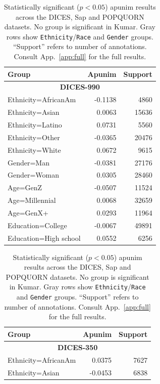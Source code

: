 \documentclass[manuscript,screen,review,anonymous]{acmart}
\theoremstyle{acmplain}
\theoremstyle{researchquestionstyle}
\begin{document}
\begin{table}[t]
	\caption{Statistically significant ($p<0.05$) apunim results across the DICES, Sap and POPQUORN datasets. No group is significant in Kumar. Gray rows show \texttt{Ethnicity}/\texttt{Race} and \texttt{Gender} groups. ``Support'' refers to number of annotations. Consult App.~\ref{app:full} for the full results.}
	\label{tab:apunim-main}
	\small
	\centering
	\setlength{\tabcolsep}{4pt}
	\begin{minipage}[t]{0.485\linewidth}
		\begin{tabularx}{\linewidth}{X r r}
			\toprule
			\textbf{Group} & \textbf{Apunim} & \textbf{Support} \\
			\midrule
			\multicolumn{3}{c}{\textbf{DICES-990}} \\
			\midrule
			\rowcolor{gray!15}
			Ethnicity=AfricanAm & -0.1138 & 4860 \\
			\rowcolor{gray!15}
			Ethnicity=Asian & 0.0063 & 15636 \\
			\rowcolor{gray!15}
			Ethnicity=Latino & 0.0731 & 5560 \\
			\rowcolor{gray!15}
			Ethnicity=Other & -0.0365 & 20476 \\
			\rowcolor{gray!15}
			Ethnicity=White & 0.0672 & 9615 \\
			\rowcolor{gray!15}
			Gender=Man & -0.0381 & 27176 \\
			\rowcolor{gray!15}
			Gender=Woman & 0.0305 & 28460 \\
			Age=GenZ & -0.0507 & 11524 \\
			Age=Millennial & 0.0068 & 32659 \\
			Age=GenX+ & 0.0293 & 11964 \\
			Education=College & -0.0067 & 49891 \\
			Education=High school & 0.0552 & 6256 \\
			\bottomrule
		\end{tabularx}
	\end{minipage}
	\hfill
	\begin{minipage}[t]{0.485\linewidth}
		\begin{tabularx}{\linewidth}{X r r}
			\toprule
			\textbf{Group} & \textbf{Apunim} & \textbf{Support} \\
			\midrule
			\multicolumn{3}{c}{\textbf{DICES-350}} \\
			\midrule
			\rowcolor{gray!15}
			Ethnicity=AfricanAm & 0.0375 & 7627 \\
			\rowcolor{gray!15}
			Ethnicity=Asian & -0.0453 & 6838 \\

\end{tabularx}
\end{minipage}
\end{table}
\end{document}

